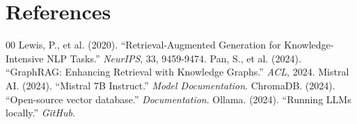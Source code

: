 \documentclass[a4paper,12pt]{article}
\begin{document}
\section{References}
\begin{thebibliography}{00}
     Lewis, P., et al. (2020). ``Retrieval-Augmented Generation for Knowledge-Intensive NLP Tasks.'' \textit{NeurIPS}, 33, 9459-9474.
     Pan, S., et al. (2024). ``GraphRAG: Enhancing Retrieval with Knowledge Graphs.'' \textit{ACL}, 2024.
     Mistral AI. (2024). ``Mistral 7B Instruct.'' \textit{Model Documentation}.
     ChromaDB. (2024). ``Open-source vector database.'' \textit{Documentation}.
     Ollama. (2024). ``Running LLMs locally.'' \textit{GitHub}.
\end{thebibliography}
\end{document}
